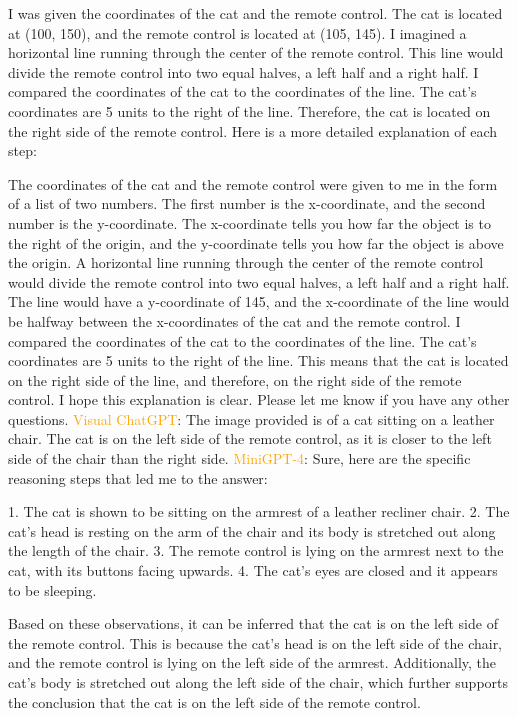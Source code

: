\begin{enumerate}
        I was given the coordinates of the cat and the remote control. The cat is located at (100, 150), and the remote control is located at (105, 145).
        I imagined a horizontal line running through the center of the remote control. This line would divide the remote control into two equal halves, a left half and a right half.
        I compared the coordinates of the cat to the coordinates of the line. The cat's coordinates are 5 units to the right of the line.
        Therefore, the cat is located on the right side of the remote control.
        Here is a more detailed explanation of each step:

        The coordinates of the cat and the remote control were given to me in the form of a list of two numbers. The first number is the x-coordinate, and the second number is the y-coordinate. The x-coordinate tells you how far the object is to the right of the origin, and the y-coordinate tells you how far the object is above the origin.
        A horizontal line running through the center of the remote control would divide the remote control into two equal halves, a left half and a right half. The line would have a y-coordinate of 145, and the x-coordinate of the line would be halfway between the x-coordinates of the cat and the remote control.
        I compared the coordinates of the cat to the coordinates of the line. The cat's coordinates are 5 units to the right of the line. This means that the cat is located on the right side of the line, and therefore, on the right side of the remote control.
        I hope this explanation is clear. Please let me know if you have any other questions.
        \subitem \textcolor{orange}{Visual ChatGPT}: The image provided is of a cat sitting on a leather chair. The cat is on the left side of the remote control, as it is closer to the left side of the chair than the right side.
        \subitem \textcolor{orange}{MiniGPT-4}: Sure, here are the specific reasoning steps that led me to the answer:

        1. The cat is shown to be sitting on the armrest of a leather recliner chair.
        2. The cat’s head is resting on the arm of the chair and its body is stretched out along the length of the chair.
        3. The remote control is lying on the armrest next to the cat, with its buttons facing upwards.
        4. The cat’s eyes are closed and it appears to be sleeping.
        
        Based on these observations, it can be inferred that the cat is on the left side of the remote control. This is because the cat’s head is on the left side of the chair, and the remote control is lying on the left side of the armrest. Additionally, the cat’s body is stretched out along the left side of the chair, which further supports the conclusion that the cat is on the left side of the remote control.
    \end{enumerate}
